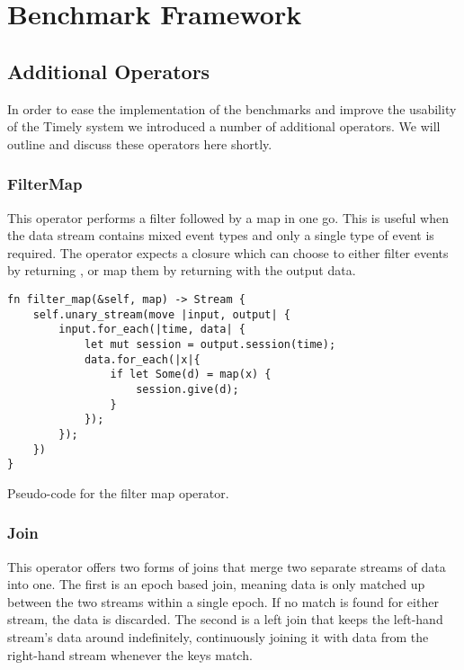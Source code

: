 \section{Benchmark Framework}


\subsection{Additional Operators}
In order to ease the implementation of the benchmarks and improve the usability of the Timely system we introduced a number of additional operators. We will outline and discuss these operators here shortly.

\subsubsection{FilterMap}
This operator performs a filter followed by a map in one go. This is useful when the data stream contains mixed event types and only a single type of event is required. The operator expects a closure which can choose to either filter events by returning , or map them by returning  with the output data.

\begin{listing}[H]
\begin{verbatim}
fn filter_map(&self, map) -> Stream {
    self.unary_stream(move |input, output| {
        input.for_each(|time, data| {
            let mut session = output.session(time);
            data.for_each(|x|{
                if let Some(d) = map(x) {
                    session.give(d);
                }
            });
        });
    })
}
\end{verbatim}
  \caption{Pseudo-code for the filter map operator.}
  \label{lst:filtermap}
\end{listing}

\subsubsection{Join}
This operator offers two forms of joins that merge two separate streams of data into one. The first is an epoch based join, meaning data is only matched up between the two streams within a single epoch. If no match is found for either stream, the data is discarded. The second is a left join that keeps the left-hand stream's data around indefinitely, continuously joining it with data from the right-hand stream whenever the keys match.

